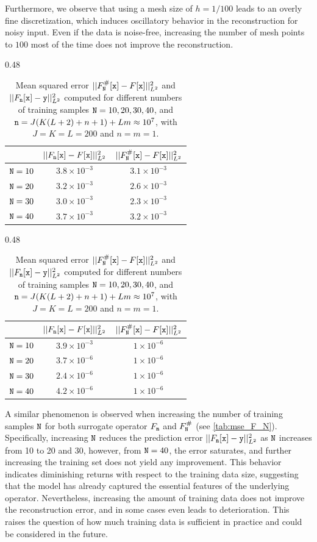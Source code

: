 \documentclass[10pt]{article}
\numberwithin{equation}{section}
\theoremstyle{nonumberplain}
\newcommand{\y}{{\tt y}}
\newcommand{\n}{{\tt n}}
\newcommand{\x}{{\tt x}}
\newcommand{\no}{{\tt N}}
\begin{document}
Furthermore, we observe that using a mesh size of $h = 1/100$ leads to an overly fine discretization, which induces oscillatory behavior in the reconstruction for noisy input. Even if the data is noise-free, increasing the number of mesh points to $100$ most of the time does not improve the reconstruction.


\begin{table}[H]
    \begin{subtable}{0.48\textwidth}
    \centering \footnotesize
    \begin{tabular}{c|c|c}
        &  $||F_\n[\x] - F[\x]||_{L^2}^2$ & $||F_\no^\#[\x] - F[\x]||_{L^2}^2$ \\ \hline
         $\no = 10$ & $3.8 \times 10^{-3}$ & $3.1 \times 10^{-3}$\\
         $\no = 20$ & $3.2 \times 10^{-3}$ & $2.6 \times 10^{-3}$ \\ 
         $\no = 30$ & $3.0 \times 10^{-3}$ & $2.3 \times 10^{-3}$\\ 
         $\no = 40$ & $3.7 \times 10^{-3}$ & $3.2 \times 10^{-3}$
    \end{tabular}
     \caption{\autoref{ex: darcyflow}}
    \end{subtable} 
    \hfill
    \begin{subtable}{0.48\textwidth}
    \centering \footnotesize
    \begin{tabular}{c|c|c}
        &  $||F_\n[\x] - F[\x]||_{L^2}^2$ & $||F_\no^\#[\x] - F[\x]||_{L^2}^2$ \\ \hline
         $\no = 10$ &  $3.9 \times 10^{-3}$ & $1 \times 10^{-6}$  \\
         $\no = 20$ &  $3.7 \times 10^{-6}$ & $1 \times 10^{-6}$   \\ 
         $\no = 30$ & $2.4 \times 10^{-6}$ & $1 \times 10^{-6}$    \\ 
         $\no = 40$ & $4.2 \times 10^{-6}$ & $1 \times 10^{-6}$ 
    \end{tabular}
     \caption{\autoref{ex:2point}}
    \end{subtable} 
    \caption{Mean squared error $||F_\no^\#[\x] - F[\x]||_{L^2}^2$ and $||F_\n[\x] - \y||_{L^2}^2$ computed for different numbers of training samples $\no = 10,20,30,40$, and $\n = J(K(L + 2) + n + 1) + Lm \approx 10^{7}$, with $J = K = L = 200$ and $n = m = 1$.} 
    \label{tab:mse_F_N}
\end{table}

A similar phenomenon is observed when increasing the number of training samples $\no$ for both surrogate operator $F_\n$ and $F_\no^\#$ (see \autoref{tab:mse_F_N}). Specifically, increasing $\no$ reduces the prediction error $||F_\n[\x] - \y||_{L^2}^2$ as $\no$ increases from 10 to 20 and 30, however, from $\no = 40$, the error saturates, and further increasing the training set does not yield any improvement. This behavior indicates diminishing returns with respect to the training data size, suggesting that the model has already captured the essential features of the underlying operator. Nevertheless, increasing the amount of training data does not improve the reconstruction error, and in some cases even leads to deterioration. This raises the question of how much training data is sufficient in practice and could be considered in the future.
\end{document}
